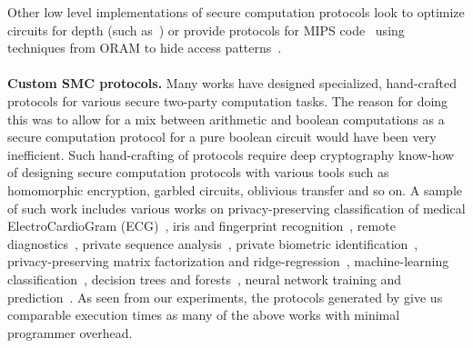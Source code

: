 Other low level implementations of secure computation protocols look to optimize circuits for depth (such as~\cite{ddkssz15}) or provide protocols for MIPS code~\cite{mips} using techniques from ORAM to hide access patterns~\cite{oram1,oram2}.
\\\\
\noindent\textbf{Custom SMC protocols.} Many works have designed specialized, hand-crafted protocols for various secure two-party computation tasks. The reason for doing this was to allow for a mix between arithmetic and boolean computations as a secure computation protocol for a pure boolean circuit would have been very inefficient. Such hand-crafting of protocols require deep cryptography know-how of designing secure computation protocols with various tools such as homomorphic encryption, garbled circuits, oblivious transfer and so on. A sample of such work includes various works on privacy-preserving classification of medical ElectroCardioGram (ECG)~\cite{ecgclassifier}, iris and fingerprint recognition~\cite{irisfingerprint}, remote diagnostics~\cite{remotediagnostics}, private sequence analysis~\cite{sequenceanalysis}, private biometric identification~\cite{biometricidentification}, privacy-preserving matrix factorization and ridge-regression~\cite{matrixfactorization, ridgeregression}, machine-learning classification~\cite{shafindss}, decision trees and forests~\cite{wu}, neural network training and prediction~\cite{secureml,minionn}. As seen from our experiments, the protocols generated by \tool give us comparable execution times as many of the above works with minimal programmer overhead. 

